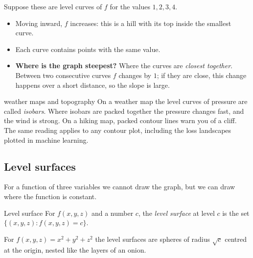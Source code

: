 Suppose these are level curves of $f$ for the values $1,2,3,4$.
\begin{itemize}
  \item Moving inward, $f$ increases: this is a hill with its top inside the smallest curve.
  \item Each curve contains points with the same value.
  \item \textbf{Where is the graph steepest?} Where the curves are \emph{closest together}.
  Between two consecutive curves $f$ changes by $1$; if they are close, this change
  happens over a short distance, so the slope is large.
\end{itemize}

\begin{reallife}{weather maps and topography}
On a weather map the level curves of pressure are called \emph{isobars}. Where isobars
are packed together the pressure changes fast, and the wind is strong. On a hiking map,
packed contour lines warn you of a cliff. The same reading applies to any contour plot,
including the loss landscapes plotted in machine learning.
\end{reallife}

\subsection{Level surfaces}

For a function of three variables we cannot draw the graph, but we can draw where
the function is constant.

\begin{definition}{Level surface}
For $f(x,y,z)$ and a number $c$, the \emph{level surface} at level $c$ is the set
$\{(x,y,z): f(x,y,z)=c\}$.
\end{definition}


For $f(x,y,z)=x^2+y^2+z^2$ the level surfaces are spheres of radius $\sqrt c$ centred at
the origin, nested like the layers of an onion.

